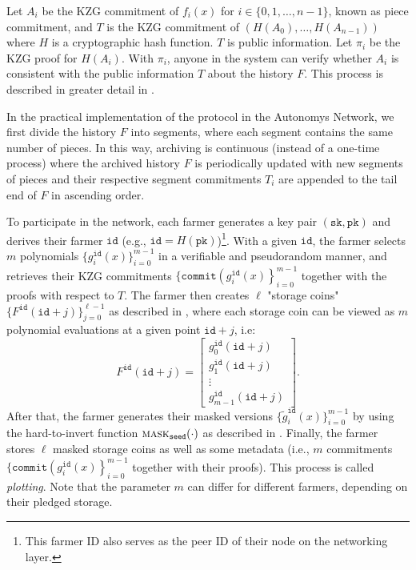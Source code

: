 \documentclass[conference]{IEEEtran}
\newcommand{\sk}{\texttt{sk}}
\newcommand{\pk}{\texttt{pk}}
\newcommand{\id}{\texttt{id}}
\newcommand{\seed}{\texttt{seed}}
\newcommand{\cmt}{\texttt{commit}}
\newcommand{\mask}{\textsc{mask}}
\begin{document}
Let $A_i$ be the KZG commitment of $f_i(x)$ for $i \in \{0, 1, \ldots, n-1\}$, known as piece commitment, and $T$ is the KZG commitment of $(H(A_0), \ldots, H(A_{n-1}))$ where $H$ is a cryptographic hash function. $T$ is public information.
Let $\pi_i$ be the KZG proof for $H(A_i)$. With $\pi_i$, anyone in the system can verify whether $A_i$ is consistent with the public information $T$ about the history $F$. This process is described in greater detail in \cite{subspacev2}.

In the practical implementation of the protocol in the Autonomys Network, we first divide the history $F$ into segments, where each segment contains the same number of pieces. In this way, archiving is continuous (instead of a one-time process) where the archived history $F$ is periodically updated with new segments of pieces and their respective segment commitments $T_i$ are appended to the tail end of $F$ in ascending order.

To participate in the network, each farmer generates a key pair $(\sk, \pk)$ and derives their farmer $\id$ (e.g., $\id = H(\pk)$)\footnote{This farmer ID also serves as the peer ID of their node on the networking layer.}.
With a given $\id$, the farmer selects $m$ polynomials $\{g_i^{\id}(x) \}_{i = 0}^{m - 1}$ in a verifiable and pseudorandom manner, and retrieves their KZG commitments $\{\cmt\left(g_i^{\id}(x) \right \}_{i = 0}^{m - 1}$ together with the proofs with respect to $T$. The farmer then creates $\ell$ "storage coins" $\{ F^{\id}(\id + j) \}_{j = 0}^{\ell - 1}$ as described in \cite{subspacev2}, where each storage coin can be viewed as $m$ polynomial evaluations at a given point $\id+j$, i.e:
\[
F^{\id}(\id + j) = \begin{bmatrix} g_0^{\id}(\id + j)\\ g_1^{\id}(\id + j)\\  \vdots \\ g_{m-1}^{\id}(\id + j) \end{bmatrix}.
\]
After that, the farmer generates their masked versions $\{\tilde{g}_i^{\id}(x) \}_{i = 0}^{m - 1}$ by using the hard-to-invert function $\mask_{\seed}(\cdot)$ as described in \cite{subspacev2}.
Finally, the farmer stores $\ell$ masked storage coins as well as some metadata (i.e., $m$ commitments $\{\cmt\left(g_i^{\id}(x) \right \}_{i = 0}^{m - 1}$ together with their proofs).
This process is called \textit{plotting}. Note that the parameter $m$ can differ for different farmers, depending on their pledged storage.
\end{document}

